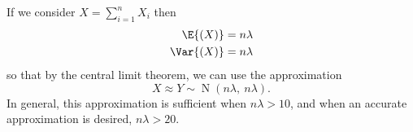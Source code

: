 \documentclass{article}
\begin{document}
If we consider \(X = \sum_{i = 1}^n X_i\) then
\begin{align*}
    \E{\left( X \right)} & = n \lambda \\
    \Var{\left( X \right)} & = n \lambda
\end{align*}
so that by the central limit theorem, we can use the approximation
\begin{equation*}
    X \approx Y \sim \operatorname{N}{\left( n\lambda,\: n\lambda \right)}.
\end{equation*}
In general, this approximation is sufficient when \(n \lambda > 10\), and when an accurate approximation is desired, \(n \lambda > 20\).
\end{document}
